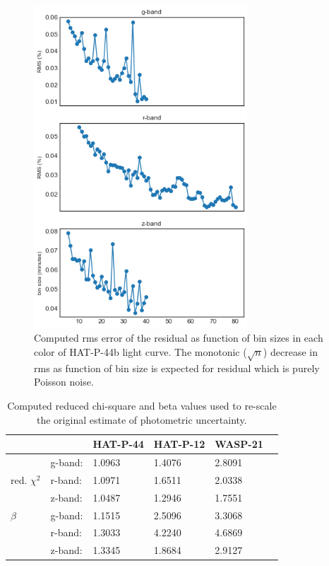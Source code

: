 \begin{figure}
\centering
\includegraphics[width=8cm]{figures/binned_rms.png}
\caption{Computed rms error of the residual as function of bin sizes in each color of HAT-P-44b light curve. The monotonic ($\sqrt{n}$) decrease in rms as function of bin size is expected for residual which is purely Poisson noise.}
\label{fig:rms}
\end{figure}

\begin{table}
\centering
\caption{Computed reduced chi-square and beta values used to re-scale the original estimate of photometric uncertainty.}
\label{tab:beta}
\begin{tabular}{llllll}
\multicolumn{2}{l}{}                    & HAT-P-44  & HAT-P-12 & WASP-21 \\ \hline
\multirow{3}{*}{red. $\chi^2$} & g-band: & 1.0963   & 1.4076  & 2.8091\\
                              & r-band: & 1.0971    & 1.6511  & 2.0338\\
                              & z-band: & 1.0487    & 1.2946  & 1.7551\\ \hline
$\beta$                       & g-band: & 1.1515 & 2.5096     & 3.3068 \\
                              & r-band: & 1.3033 & 4.2240     & 4.6869 \\
                              & z-band: & 1.3345 & 1.8684     & 2.9127 \\  \hline
\end{tabular}
\end{table}

